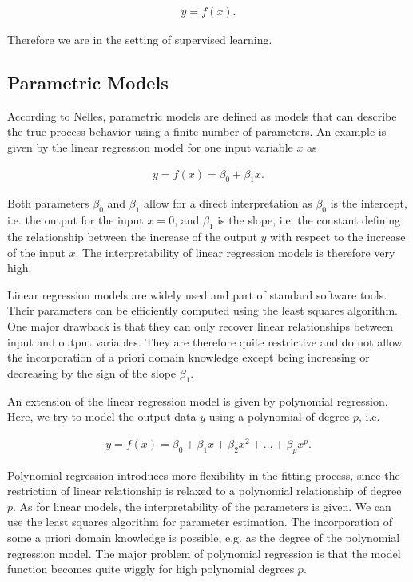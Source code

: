 \documentclass[10pt,a4paper]{article}
\begin{document}
\begin{align} \label{eq:basic-model-structure}
	y = f(x).
\end{align}

Therefore we are in the setting of supervised learning. 

\subsection{Parametric Models}

According to Nelles, parametric models are defined as models that can describe the true process behavior using a finite number of parameters.\cite{nelles2013nonlinear} An example is given by the linear regression model for one input variable $x$ as

\begin{align} \label{eq:classical-linear-model}
	y= f(x) = \beta_0 + \beta_1 x.
\end{align}

Both parameters $\beta_0$ and $\beta_1$ allow for a direct interpretation as $\beta_0$ is the intercept, i.e. the output for the input $x=0$, and $\beta_1$ is the slope, i.e. the constant defining the relationship between the increase of the output $y$ with respect to the increase of the input $x$.  The interpretability of linear regression models is therefore very high. 

Linear regression models are widely used and part of standard software tools. Their parameters can be efficiently computed using the least squares algorithm. One major drawback is that they can only recover linear relationships between input and output variables. They are therefore quite restrictive and do not allow the incorporation of a priori domain knowledge except being increasing or decreasing by the sign of the slope $\beta_1$. 

An extension of the linear regression model is given by polynomial regression. Here, we try to model the output data $y$ using a polynomial of degree $p$, i.e.

\begin{align} \label{eq:polynomial-model}
	y = f(x) = \beta_0 + \beta_1 x + \beta_2 x^2 + \dots + \beta_p x^p.
\end{align}

Polynomial regression introduces more flexibility in the fitting process, since the restriction of linear relationship is relaxed to a polynomial relationship of degree $p$. As for linear models, the interpretability of the parameters is given. We can use the least squares algorithm for parameter estimation. The incorporation of some a priori domain knowledge is possible, e.g. as the degree of the polynomial regression model. The major problem of polynomial regression is that the model function becomes quite wiggly for high polynomial degrees $p$. 
\end{document}
